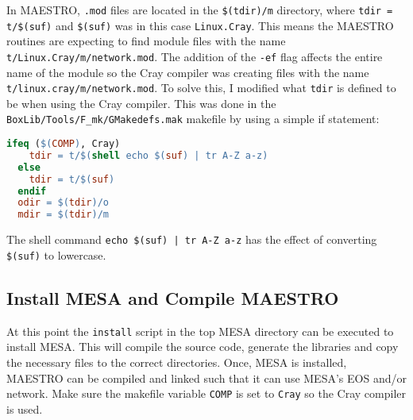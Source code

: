 In {\sf MAESTRO}, {\tt .mod} files are located in the {\tt \$(tdir)/m} 
directory, where {\tt tdir = t/\$(suf)} and {\tt \$(suf)} was in this case 
{\tt Linux.Cray}. This means the {\sf MAESTRO} routines are expecting to find 
module files with the name {\tt t/Linux.Cray/m/network.mod}. The addition of 
the {\tt -ef} flag affects the entire name of the module so the Cray compiler 
was creating files with the name {\tt t/linux.cray/m/network.mod}. To solve 
this, I modified what {\tt tdir} is defined to be when using the Cray compiler. 
This was done in the {\tt BoxLib/Tools/F\_mk/GMakedefs.mak} makefile by using 
a simple if statement:
\begin{lstlisting}[language=make,mathescape=false]
  ifeq ($(COMP), Cray)
    tdir = t/$(shell echo $(suf) | tr A-Z a-z)
  else
    tdir = t/$(suf)
  endif
  odir = $(tdir)/o
  mdir = $(tdir)/m
\end{lstlisting}
The shell command {\tt echo \$(suf) | tr A-Z a-z} has the effect of converting 
{\tt \$(suf)} to lowercase.

\subsection{Install {\sf MESA} and Compile {\sf MAESTRO}}

At this point the {\tt install} script in the top {\sf MESA} directory can be 
executed to install {\sf MESA}. This will compile the source code, generate 
the libraries and copy the necessary files to the correct directories. Once, 
{\sf MESA} is installed, {\sf MAESTRO} can be compiled and linked such that 
it can use {\sf MESA}'s EOS and/or network. Make sure the makefile variable 
{\tt COMP} is set to {\tt Cray} so the Cray compiler is used.


